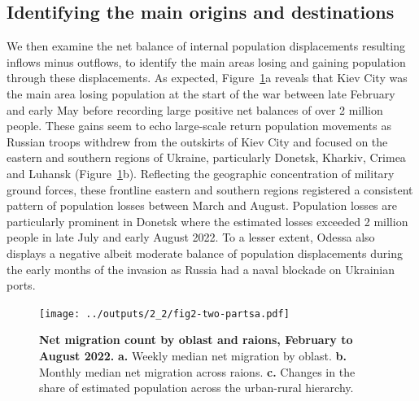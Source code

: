 \documentclass[
  sn-nature,
  11pt,
]{sn-jnl}
\begin{document}
\subsection{Identifying the main origins and
destinations}\label{sec-odm}

We then examine the net balance of internal population displacements
resulting inflows minus outflows, to identify the main areas losing and
gaining population through these displacements. As expected,
Figure~\ref{fig-heatmaps}a reveals that Kiev City was the main area
losing population at the start of the war between late February and
early May before recording large positive net balances of over 2 million
people. These gains seem to echo large-scale return population movements
as Russian troops withdrew from the outskirts of Kiev City and focused
on the eastern and southern regions of Ukraine, particularly Donetsk,
Kharkiv, Crimea and Luhansk (Figure~\ref{fig-heatmaps}b). Reflecting the
geographic concentration of military ground forces, these frontline
eastern and southern regions registered a consistent pattern of
population losses between March and August. Population losses are
particularly prominent in Donetsk where the estimated losses exceeded 2
million people in late July and early August 2022. To a lesser extent,
Odessa also displays a negative albeit moderate balance of population
displacements during the early months of the invasion as Russia had a
naval blockade on Ukrainian ports.

\begin{figure}

\begin{minipage}{\linewidth}

\texttt{[image: ../outputs/2\_2/fig2-two-partsa.pdf]}

\end{minipage}%

\caption{\label{fig-heatmaps}\textbf{Net migration count by oblast and
raions, February to August 2022.} \textbf{a.} Weekly median net
migration by oblast. \textbf{b.} Monthly median net migration across
raions. \textbf{c.} Changes in the share of estimated population across
the urban-rural hierarchy.}

\end{figure}%
\end{document}
